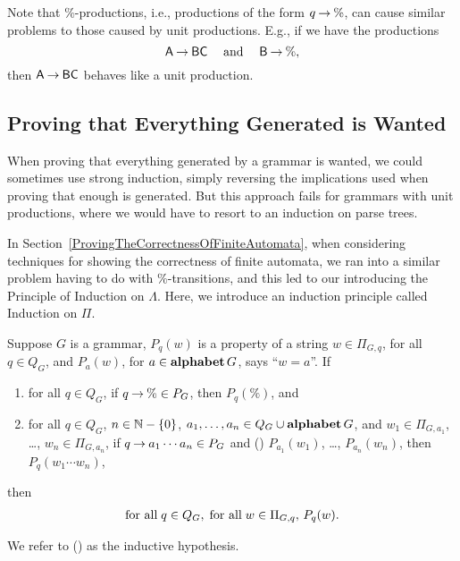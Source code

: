 Note that $\%$-productions, i.e., productions of the form $q\mathbin{\to}\%$,
can cause similar problems to those caused by unit productions.  E.g.,
if we have the productions
\begin{displaymath}
  \mathsf{A}\mathbin{\to} \mathsf{B}\mathsf{C} \quad\;\allowbreak\mbox{and}\allowbreak\;\quad \mathsf{B}\mathbin{\to}\% ,
\end{displaymath}
then $\mathsf{A}\mathbin{\to}\mathsf{B}\mathsf{C}$ behaves like a unit production.

\subsection{Proving that Everything Generated is Wanted}

When proving that everything generated by a grammar is wanted, we
could sometimes use strong induction, simply reversing the
implications used when proving that enough is generated.  But this
approach fails for grammars with unit productions, where we would have
to resort to an induction on parse trees.  

In Section~\ref{ProvingTheCorrectnessOfFiniteAutomata}, when
considering techniques for showing the correctness of finite automata,
we ran into a similar problem having to do with $\%$-transitions, and
this led to our introducing the Principle of Induction on $\Lambda$.
Here, we introduce an induction principle called Induction on $\Pi$.

\begin{theorem}
%
Suppose $G$ is a grammar, $P_q(w)$ is a property of a
string $w\in\Pi_{G,q}$, for all $q\in Q_G$, and
$P_a(w)$, for $a\in\mathbf{alphabet}\,G$, says ``$w=a$''.
If
\begin{enumerate}[\quad(1)]
\item for all $q\in Q_G$, if $q\mathbin{\to}\%\in P_G$, then $P_q(\%)$, and

\item for all $q\in Q_G$, $n\in\mathbb{N}-\{0\}$, $a_1,\ldots,a_n\in
  Q_G\cup\mathbf{alphabet}\,G$, and $w_1\in\Pi_{G,a_1}$, \ldots,
  $w_n\in\Pi_{G,a_n}$, if $q\mathbin{\to} a_1\cdots a_n\in P_G$ and (\dag)
  $P_{a_1}(w_1)$, \ldots, $P_{a_n}(w_n)$, then $P_q(w_1\cdots w_n)$,
\end{enumerate}
then
\begin{gather*}
  \allowbreak\mbox{for all}\allowbreak\;q\in Q_G, \;\allowbreak\mbox{for all}\allowbreak\;w\in\Pi_{G,q},\,P_q(w).
\end{gather*}
\end{theorem}
We refer to (\dag) as the inductive hypothesis.

